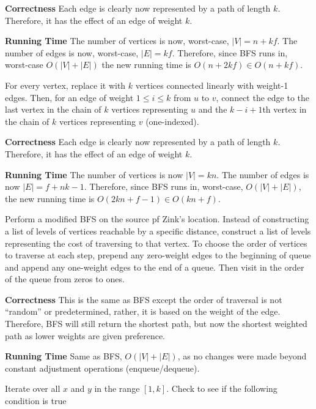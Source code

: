 \documentclass[12pt,twoside]{article}
\begin{document}
\begin{problems}
\begin{problemparts}
    {\bf Correctness} Each edge is clearly now represented by a path of
    length $k$. Therefore, it has the effect of an edge of weight $k$.

    {\bf Running Time} The number of vertices is now, worst-case, $|V| = n +
    kf$. The number of edges is now, worst-case, $|E| = kf$. Therefore, since
    BFS runs in, worst-case $O(|V| + |E|)$ the new running time is $O(n +
    2kf) \in O(n + kf)$.

 For every vertex, replace it with $k$ vertices
    connected linearly with weight-1 edges. Then, for an edge of weight $ 1
    \leq i \leq k$ from $u$ to $v$, connect the edge to the last vertex in
    the chain of $k$ vertices representing $u$ and the $k - i + 1$th vertex
    in the chain of $k$ vertices representing $v$ (one-indexed).

    {\bf Correctness} Each edge is clearly now represented by a path of
    length $k$. Therefore, it has the effect of an edge of weight $k$.

    {\bf Running Time} The number of vertices is now $|V| = kn$. The number
    of edges is now $|E| = f + nk - 1$. Therefore, since BFS runs in,
    worst-case, $O(|V| + |E|)$, the new running time is $O(2kn + f - 1) \in
    O(kn + f)$.
\end{problemparts}

 Perform a modified BFS on the source pf Zink's
    location. Instead of constructing a list of levels of vertices reachable
    by a specific distance, construct a list of levels representing the cost
    of traversing to that vertex. To choose the order of vertices to traverse
    at each step, prepend any zero-weight edges to the beginning of queue and
    append any one-weight edges to the end of a queue. Then visit in the
    order of the queue from zeros to ones.

    {\bf Correctness} This is the same as BFS except the order of traversal
    is not ``random'' or predetermined, rather, it is based on the weight of
    the edge. Therefore, BFS will still return the shortest path, but now the
    shortest weighted path as lower weights are given preference.

    {\bf Running Time} Same as BFS, $O(|V| + |E|)$, as no changes were made
    beyond constant adjustment operations (enqueue/dequeue).

\newpage
\problem  %

\begin{problemparts}
 Iterate over all $x$ and $y$ in the range $[1,
    k]$. Check to see if the following condition is true


\end{problemparts}
\end{problems}
\end{document}

